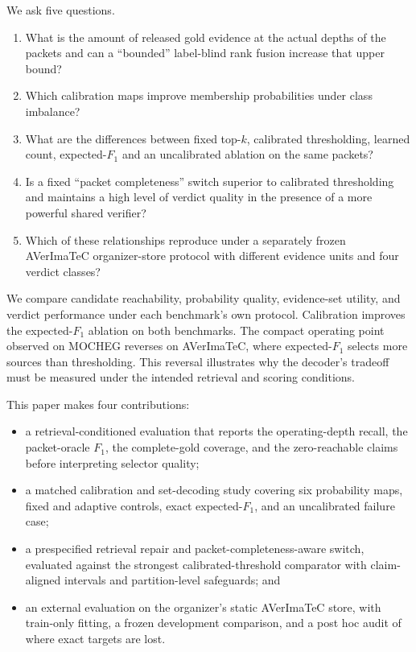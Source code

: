 We ask five questions.
\begin{enumerate}
    \item What is the amount of released gold evidence at the actual depths of the packets and can a ``bounded'' label-blind rank fusion increase that upper bound?
    \item Which calibration maps improve membership probabilities under class imbalance?
    \item What are the differences between fixed top-$k$, calibrated thresholding, learned count, expected-$F_1$ and an uncalibrated ablation on the same packets?
    \item Is a fixed ``packet completeness'' switch superior to calibrated thresholding and maintains a high level of verdict quality in the presence of a more powerful shared verifier?
    \item Which of these relationships reproduce under a separately frozen AVerImaTeC organizer-store protocol with different evidence units and four verdict classes?
\end{enumerate}

We compare candidate reachability, probability quality, evidence-set utility, and verdict performance under each benchmark's own protocol. Calibration improves the expected-$F_1$ ablation on both benchmarks. The compact operating point observed on MOCHEG reverses on AVerImaTeC, where expected-$F_1$ selects more sources than thresholding. This reversal illustrates why the decoder's tradeoff must be measured under the intended retrieval and scoring conditions.

This paper makes four contributions:
\begin{itemize}
    \item a retrieval-conditioned evaluation that reports the operating-depth recall, the packet-oracle $F_1$, the complete-gold coverage, and the zero-reachable claims before interpreting selector quality;
    \item a matched calibration and set-decoding study covering six probability maps, fixed and adaptive controls, exact expected-$F_1$, and an uncalibrated failure case;
    \item a prespecified retrieval repair and packet-completeness-aware switch, evaluated against the strongest calibrated-threshold comparator with claim-aligned intervals and partition-level safeguards; and
    \item an external evaluation on the organizer's static AVerImaTeC store, with train-only fitting, a frozen development comparison, and a post hoc audit of where exact targets are lost.
\end{itemize}
